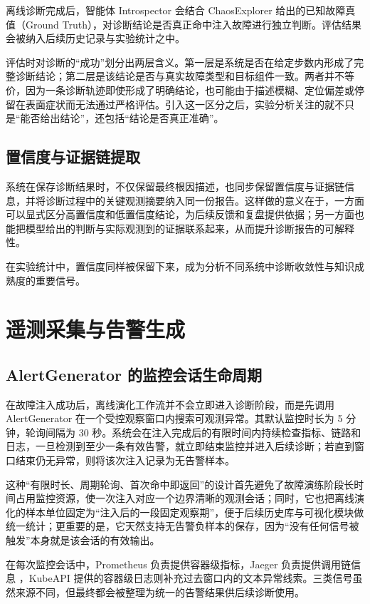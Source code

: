 离线诊断完成后，智能体 Introspector 会结合 ChaosExplorer 给出的已知故障真值（Ground Truth），对诊断结论是否真正命中注入故障进行独立判断。评估结果会被纳入后续历史记录与实验统计之中。

评估时对诊断的“成功”划分出两层含义。第一层是系统是否在给定步数内形成了完整诊断结论；第二层是该结论是否与真实故障类型和目标组件一致。两者并不等价，因为一条诊断轨迹即使形成了明确结论，也可能由于描述模糊、定位偏差或停留在表面症状而无法通过严格评估。引入这一区分之后，实验分析关注的就不只是“能否给出结论”，还包括“结论是否真正准确”。

\subsection{置信度与证据链提取}

系统在保存诊断结果时，不仅保留最终根因描述，也同步保留置信度与证据链信息，并将诊断过程中的关键观测摘要纳入同一份报告。这样做的意义在于，一方面可以显式区分高置信度和低置信度结论，为后续反馈和复盘提供依据；另一方面也能把模型给出的判断与实际观测到的证据联系起来，从而提升诊断报告的可解释性。

在实验统计中，置信度同样被保留下来，成为分析不同系统中诊断收敛性与知识成熟度的重要信号。

\section{遥测采集与告警生成}
\label{sec:telemetry_impl}

\subsection{AlertGenerator 的监控会话生命周期}

在故障注入成功后，离线演化工作流并不会立即进入诊断阶段，而是先调用 AlertGenerator 在一个受控观察窗口内搜索可观测异常。其默认监控时长为 5 分钟，轮询间隔为 30 秒。系统会在注入完成后的有限时间内持续检查指标、链路和日志，一旦检测到至少一条有效告警，就立即结束监控并进入后续诊断；若直到窗口结束仍无异常，则将该次注入记录为无告警样本。

这种“有限时长、周期轮询、首次命中即返回”的设计首先避免了故障演练阶段长时间占用监控资源，使一次注入对应一个边界清晰的观测会话；同时，它也把离线演化的样本单位固定为“注入后的一段固定观察期”，便于后续历史库与可视化模块做统一统计；更重要的是，它天然支持无告警负样本的保存，因为“没有任何信号被触发”本身就是该会话的有效输出。

在每次监控会话中，Prometheus\cite{prometheus} 负责提供容器级指标，Jaeger\cite{jaeger} 负责提供调用链信息 ，KubeAPI 提供的容器级日志则补充过去窗口内的文本异常线索。三类信号虽然来源不同，但最终都会被整理为统一的告警结果供后续诊断使用。

